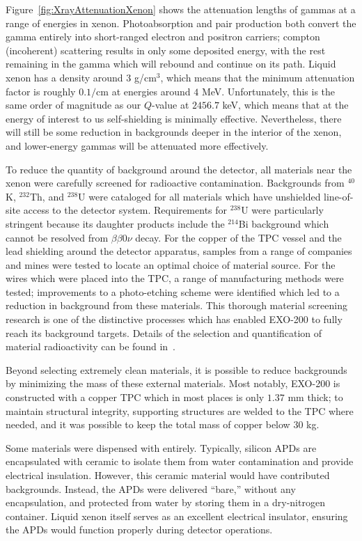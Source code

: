 Figure~\ref{fig:XrayAttenuationXenon} shows the attenuation lengths of gammas at a range of energies in xenon.  Photoabsorption and pair production both convert the gamma entirely into short-ranged electron and positron carriers; compton (incoherent) scattering results in only some deposited energy, with the rest remaining in the gamma which will rebound and continue on its path.  Liquid xenon has a density around $3$ g/cm$^3$, which means that the minimum attenuation factor is roughly $0.1/\text{cm}$ at energies around $4$ MeV.  Unfortunately, this is the same order of magnitude as our $Q$-value at $2456.7$ keV, which means that at the energy of interest to us self-shielding is minimally effective.  Nevertheless, there will still be some reduction in backgrounds deeper in the interior of the xenon, and lower-energy gammas will be attenuated more effectively.

To reduce the quantity of background around the detector, all materials near the xenon were carefully screened for radioactive contamination.  Backgrounds from $^{40}$K, $^{232}$Th, and $^{238}$U were cataloged for all materials which have unshielded line-of-site access to the detector system.  Requirements for $^{238}$U were particularly stringent because its daughter products include the $^{214}$Bi background which cannot be resolved from $\beta\beta 0\nu$ decay.  For the copper of the TPC vessel and the lead shielding around the detector apparatus, samples from a range of companies and mines were tested to locate an optimal choice of material source.  For the wires which were placed into the TPC, a range of manufacturing methods were tested; improvements to a photo-etching scheme were identified which led to a reduction in background from these materials.  This thorough material screening research is one of the distinctive processes which has enabled EXO-200 to fully reach its background targets.  Details of the selection and quantification of material radioactivity can be found in~\cite{MaterialsCatalog}.

Beyond selecting extremely clean materials, it is possible to reduce backgrounds by minimizing the mass of these external materials.  Most notably, EXO-200 is constructed with a copper TPC which in most places is only $1.37$ mm thick; to maintain structural integrity, supporting structures are welded to the TPC where needed, and it was possible to keep the total mass of copper below $30$ kg.~\cite{detectorPartI}

Some materials were dispensed with entirely.  Typically, silicon APDs are encapsulated with ceramic to isolate them from water contamination and provide electrical insulation.  However, this ceramic material would have contributed backgrounds.  Instead, the APDs were delivered ``bare,'' without any encapsulation, and protected from water by storing them in a dry-nitrogen container.  Liquid xenon itself serves as an excellent electrical insulator, ensuring the APDs would function properly during detector operations.~\cite{EXOLAAPD}

